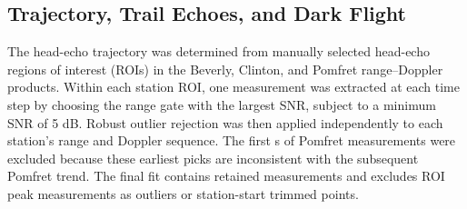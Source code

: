 \subsection{Trajectory, Trail Echoes, and Dark Flight}

The head-echo trajectory was determined from manually selected head-echo
regions of interest (ROIs) in the Beverly, Clinton, and Pomfret
range--Doppler products.  Within each station ROI, one measurement was
extracted at each time step by
choosing the range gate with the largest SNR, subject to a minimum SNR of
5 dB.  Robust outlier rejection was then applied independently to each
station's range and Doppler sequence.  The first
\TrajectoryPomfretStartTrimS{} s of Pomfret measurements were excluded because
these earliest picks are inconsistent with the subsequent Pomfret trend.  The
final fit contains \TrajectoryNObservations{} retained measurements and
excludes \TrajectoryNRejected{} ROI peak measurements as outliers or
station-start trimmed points.

